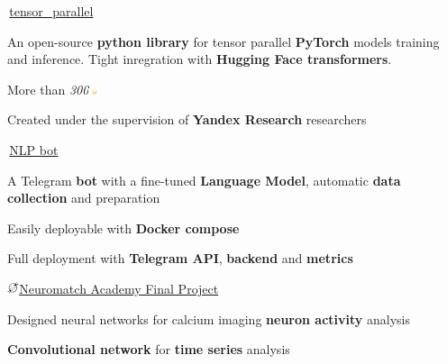 
\begin{cventries}
  \cventry
    {} %
    {\,\faGithub\acvHeaderIconSep\href{https://github.com/BlackSamorez/tensor_parallel}{tensor\_parallel}} %
    {} %
    {} %
    {
      \begin{cvitems} %
        \item {An open-source \textbf{python library} for tensor parallel \textbf{PyTorch} models training and inference. Tight inregration with \textbf{Hugging Face transformers}.}
        \item {More than \textit{300}\includegraphics[width=3.5mm]{image.png}}
        \item {Created under the supervision of \textbf{Yandex Research} researchers}
      \end{cvitems}
    }
    
  \cventry
    {} %
    {\,\faGithub\acvHeaderIconSep\href{https://github.com/BlackSamorez/ebanko}{NLP bot}} %
    {} %
    {} %
    {
      \begin{cvitems} %
        \item {A Telegram \textbf{bot} with a fine-tuned \textbf{Language Model}, automatic \textbf{data collection} and preparation}
        \item {Easily deployable with \textbf{Docker compose}}
		\item {Full deployment with \textbf{Telegram API}, \textbf{backend} and \textbf{metrics}}
      \end{cvitems}
    }
    
  \cventry
    {}
    {\includegraphics[width=3.5mm]{snippy-nma.png}\acvHeaderIconSep\href{https://portal.neuromatchacademy.org/certificate/a6398835-adc9-4528-99d6-347675c05ffd}{Neuromatch Academy Final Project}}
    {}
    {}
    {
      \begin{cvitems}
        \item {Designed neural networks for calcium imaging \textbf{neuron activity} analysis}
        \item {\textbf{Convolutional network} for \textbf{time series} analysis}
      \end{cvitems}
    }

\end{cventries}